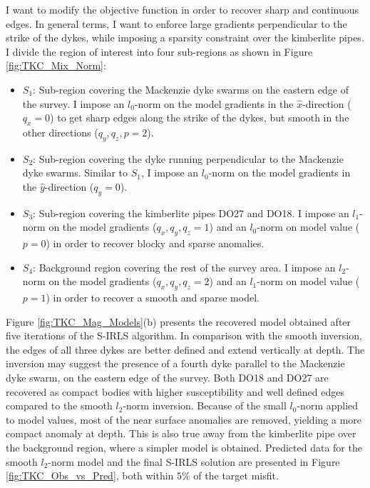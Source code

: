 I want to modify the objective function in order to recover sharp and continuous edges.
In general terms, I want to enforce large gradients perpendicular to the strike of the dykes, while imposing a sparsity constraint over the kimberlite pipes.
I divide the region of interest into four sub-regions as shown in Figure \ref{fig:TKC_Mix_Norm}:
\begin{itemize}
\item{$S_1$: Sub-region covering the Mackenzie dyke swarms on the eastern edge of the survey. 
I impose an $l_0$-norm on the model gradients in the $\hat x$-direction ($q_x = 0$) to get sharp edges along the strike of the dykes, but smooth in the other directions ($q_y, q_z, p = 2$). }
\item{$S_2$: Sub-region covering the dyke running perpendicular to  the Mackenzie dyke swarms. Similar to $S_1$, I impose an $l_0$-norm on the model gradients in the $\hat y$-direction ($q_y = 0$). }
\item{$S_3$: Sub-region covering the kimberlite pipes DO27 and DO18. I impose an $l_1$-norm on the model gradients ($q_x, q_y, q_z = 1$) and an $l_0$-norm on model value ($p=0$) in order to recover blocky and sparse anomalies. }
\item{$S_4$: Background region covering the rest of the survey area. I impose an $l_2$-norm on the model gradients ($q_x, q_y, q_z = 2$) and an $l_1$-norm on model value  ($p=1$) in order to recover a smooth and sparse model. }
\end{itemize}

Figure \ref{fig:TKC_Mag_Models}(b) presents the recovered model obtained after five iterations of the S-IRLS algorithm. 
In comparison with the smooth inversion, the edges of all three dykes are better defined and extend vertically at depth. 
The inversion may suggest the presence of a fourth dyke parallel to the Mackenzie dyke swarm, on the eastern edge of the survey.
Both DO18 and DO27 are recovered as compact bodies with higher susceptibility and well defined edges compared to the smooth $l_2$-norm inversion. 
Because of the small $l_0$-norm applied to model values, most of the near surface anomalies are removed, yielding a more compact anomaly at depth.
This is also true away from the kimberlite pipe over the background region, where a simpler model is obtained.
Predicted data for the smooth $l_2$-norm model and the final S-IRLS solution are presented in Figure \ref{fig:TKC_Obs_vs_Pred}, both within $5\%$ of the target misfit.

